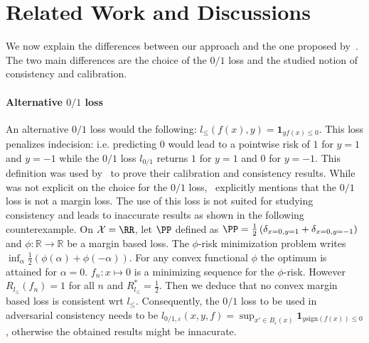 \section{Related Work and Discussions}
We now explain the differences between our approach and the one proposed by~\citet{bao2020calibrated,awasthi2021calibration,awasthi2021finer}. The two main differences are the choice of the $0/1$ loss and the studied notion of consistency and calibration.
\paragraph{Alternative $0/1$ loss}
An alternative $0/1$ loss would the following: $l_{\leq}(f(x),y)=\mathbf{1}_{yf(x)\leq 0}$. This loss penalizes indecision: i.e. predicting $0$ would lead to a pointwise risk of $1$ for $y=1$ and $y=-1$ while the $0/1$ loss $l_{0/1}$ returns $1$ for $y=1$ and $0$ for $y=-1$. This definition was used by~\citet{bao2020calibrated,awasthi2021calibration,awasthi2021finer} to prove their calibration and consistency results. While~\citet{bartlett2006convexity} was not explicit on the choice for the $0/1$ loss,~\citet{steinwart2007compare} explicitly mentions that the $0/1$ loss is not a margin loss. The use of this loss is not suited for studying consistency and leads to inaccurate results as shown in the following counterexample. On $\mathcal{X}= \RR$, let $\PP$ defined as 
$\PP = \frac12\left(\delta_{x=0,y=1}+\delta_{x=0,y=-1}\right)$ and $\phi:\mathbb{R}\to\mathbb{R}$ be a margin based loss. The $\phi$-risk minimization problem writes $\inf_{\alpha} \frac{1}{2} (\phi(\alpha)+\phi(-\alpha))$. For any convex functional $\phi$ the optimum is attained for $\alpha=0$. $f_n:x\mapsto 0$ is a minimizing sequence for the $\phi$-risk. However $R_{l_{\leq}}(f_n)=1$ for all $n$ and $R_{l_{\leq}}^*=\frac{1}{2}$. Then we deduce that no convex margin based loss is consistent wrt $l_{\leq}$. Consequently, the $0/1$ loss to be used in adversarial consistency needs to be $l_{0/1,\varepsilon}(x,y,f) = \sup_{x'\in B_\varepsilon(x)} \mathbf{1}_{y\text{sign}(f(x))\leq 0}$, otherwise the obtained results might be innacurate.



